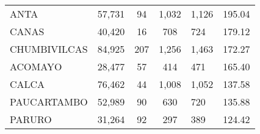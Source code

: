 \begin{tabular}{lrcclr}
	\cellcolor[HTML]{FFFF99}ANTA                                   & 57,731                                                         & 94                                                         & 1,032                & 1,126                                                               & 195.04                                                                       \\
	\cellcolor[HTML]{FFFF99}CANAS                                  & 40,420                                                         & 16                                                         & 708                  & 724                                                                 & 179.12                                                                       \\
	\cellcolor[HTML]{C6E0B4}CHUMBIVILCAS                           & 84,925                                                         & 207                                                        & 1,256                & 1,463                                                               & 172.27                                                                       \\
	\cellcolor[HTML]{C6E0B4}ACOMAYO                                & 28,477                                                         & 57                                                         & 414                  & 471                                                                 & 165.40                                                                       \\
	\cellcolor[HTML]{C6E0B4}CALCA                                  & 76,462                                                         & 44                                                         & 1,008                & 1,052                                                               & 137.58                                                                       \\
	\cellcolor[HTML]{C6E0B4}PAUCARTAMBO                            & 52,989                                                         & 90                                                         & 630                  & 720                                                                 & 135.88                                                                       \\
	\cellcolor[HTML]{C6E0B4}PARURO                                 & 31,264                                                         & 92                                                         & 297                  & 389                                                                 & 124.42                                                                       \\

\end{tabular}
